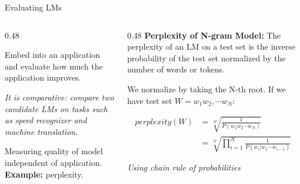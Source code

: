 \documentclass[aspectratio=169,xcolor=dvipsnames,svgnames,x11names,fleqn]{beamer}
\begin{document}
\begin{frame}{Evaluating LMs}
\vspace{-5pt}
    \begin{columns}[T]
        \begin{column}{0.48\textwidth}
            \small
            \begin{tcolorbox}[colback=evalSlate!5, colframe=evalSlate, arc=1mm, title=\scriptsize Extrinsic Evaluation, fonttitle=\bfseries]
                Embed into an application and evaluate how much the application improves.
            \end{tcolorbox}
            
            \vspace{2pt}
            \textit{\scriptsize It is comparative: compare two candidate LMs on tasks such as speed recognizer and machine translation.}

            \vspace{8pt}
            
            \begin{tcolorbox}[colback=evalAzure!5, colframe=evalAzure, arc=1mm, title=\scriptsize Intrinsic Evaluation, fonttitle=\bfseries]
                Measuring quality of model independent of application. 
                \vspace{2pt}
                \newline \textbf{Example:} \textcolor{evalAzure}{perplexity}.
            \end{tcolorbox}
        \end{column}

        \begin{column}{0.48\textwidth}
            \scriptsize
            \textcolor{evalSlate}{\textbf{Perplexity of N-gram Model:}}
            The perplexity of an LM on a test set is the inverse probability of the test set normalized by the number of words or tokens. 
            
            \vspace{4pt}
            We normalize by taking the N-th root. If we have test set $W = w_1 w_2, \cdots w_N$:

            \begin{tcolorbox}[colback=white, colframe=evalSlate!30, arc=1mm]
                \begin{align*}
                perplexity(W) & = \sqrt[N]{\frac{1}{P(w_1 w_2 \cdots w_N)}}\\
                & = \sqrt[N]{\prod_{i=1}^N \frac{1}{P(w_i | w_1  \cdots w_{i-1})}}
                \end{align*}
            \end{tcolorbox}
            \centering \tiny \textit{Using chain rule of probabilities}
        \end{column}
    \end{columns}



\end{frame}
\end{document}
